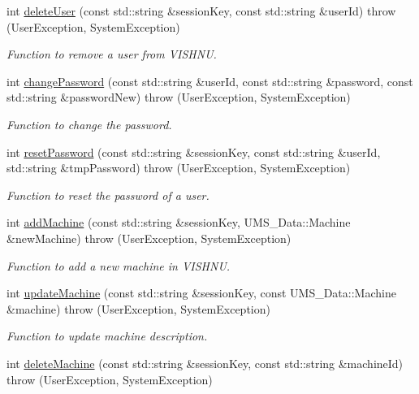 \begin{DoxyCompactItemize}
int \hyperlink{namespacevishnu_a6c83f6b72fdb7ac3b240f14a19f11786}{deleteUser} (const std::string \&sessionKey, const std::string \&userId)  throw (UserException, SystemException)
\begin{DoxyCompactList}\small\item\em Function to remove a user from VISHNU. \item\end{DoxyCompactList}\item 
int \hyperlink{namespacevishnu_a24ec95c164ce8905b8eccf98e9bb633e}{changePassword} (const std::string \&userId, const std::string \&password, const std::string \&passwordNew)  throw (UserException, SystemException)
\begin{DoxyCompactList}\small\item\em Function to change the password. \item\end{DoxyCompactList}\item 
int \hyperlink{namespacevishnu_a11f16b7501b8814c491d13431409051c}{resetPassword} (const std::string \&sessionKey, const std::string \&userId, std::string \&tmpPassword)  throw (UserException, SystemException)
\begin{DoxyCompactList}\small\item\em Function to reset the password of a user. \item\end{DoxyCompactList}\item 
int \hyperlink{namespacevishnu_aca4f5c2716ce1dd8ddc15a2554c95004}{addMachine} (const std::string \&sessionKey, UMS\_\-Data::Machine \&newMachine)  throw (UserException, SystemException)
\begin{DoxyCompactList}\small\item\em Function to add a new machine in VISHNU. \item\end{DoxyCompactList}\item 
int \hyperlink{namespacevishnu_a1f8fe4e8fa5956be1f264e9a5f78c9f1}{updateMachine} (const std::string \&sessionKey, const UMS\_\-Data::Machine \&machine)  throw (UserException, SystemException)
\begin{DoxyCompactList}\small\item\em Function to update machine description. \item\end{DoxyCompactList}\item 
int \hyperlink{namespacevishnu_abdd14f47db308fc03655149ac7d93199}{deleteMachine} (const std::string \&sessionKey, const std::string \&machineId)  throw (UserException, SystemException)

\end{DoxyCompactItemize}
